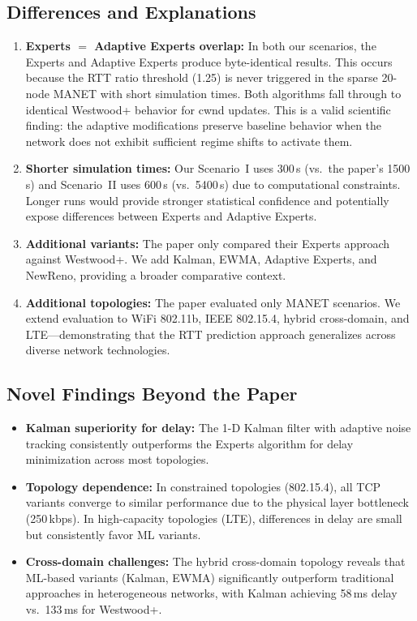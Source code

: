 \documentclass[12pt,a4paper]{article}
\begin{document}
\subsection{Differences and Explanations}

\begin{enumerate}
    \item \textbf{Experts $=$ Adaptive Experts overlap:} In both our scenarios, the Experts and Adaptive Experts produce byte-identical results. This occurs because the RTT ratio threshold (1.25) is never triggered in the sparse 20-node MANET with short simulation times. Both algorithms fall through to identical Westwood+ behavior for cwnd updates. This is a valid scientific finding: the adaptive modifications preserve baseline behavior when the network does not exhibit sufficient regime shifts to activate them.

    \item \textbf{Shorter simulation times:} Our Scenario~I uses 300\,s (vs.~the paper's 1500\,s) and Scenario~II uses 600\,s (vs.~5400\,s) due to computational constraints. Longer runs would provide stronger statistical confidence and potentially expose differences between Experts and Adaptive Experts.

    \item \textbf{Additional variants:} The paper only compared their Experts approach against Westwood+. We add Kalman, EWMA, Adaptive Experts, and NewReno, providing a broader comparative context.

    \item \textbf{Additional topologies:} The paper evaluated only MANET scenarios. We extend evaluation to WiFi 802.11b, IEEE 802.15.4, hybrid cross-domain, and LTE---demonstrating that the RTT prediction approach generalizes across diverse network technologies.
\end{enumerate}

\subsection{Novel Findings Beyond the Paper}

\begin{itemize}
    \item \textbf{Kalman superiority for delay:} The 1-D Kalman filter with adaptive noise tracking consistently outperforms the Experts algorithm for delay minimization across most topologies.
    \item \textbf{Topology dependence:} In constrained topologies (802.15.4), all TCP variants converge to similar performance due to the physical layer bottleneck (250\,kbps). In high-capacity topologies (LTE), differences in delay are small but consistently favor ML variants.
    \item \textbf{Cross-domain challenges:} The hybrid cross-domain topology reveals that ML-based variants (Kalman, EWMA) significantly outperform traditional approaches in heterogeneous networks, with Kalman achieving 58\,ms delay vs.~133\,ms for Westwood+.
\end{itemize}
\end{document}
